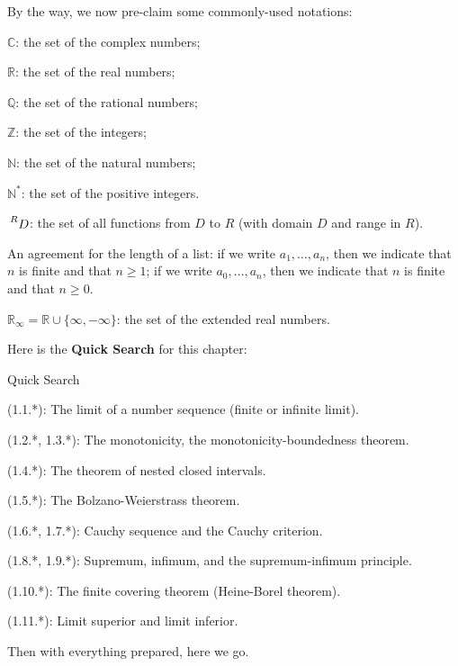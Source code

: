 \documentclass{article}
\begin{document}
By the way, we now pre-claim some commonly-used notations:
\begin{compactenum}
    \item $\mathbb{C}$: the set of the complex numbers;
    \item $\mathbb{R}$: the set of the real numbers;
    \item $\mathbb{Q}$: the set of the rational numbers;
    \item $\mathbb{Z}$: the set of the integers;
    \item $\mathbb{N}$: the set of the natural numbers;
    \item $\mathbb{N^\ast}$: the set of the positive integers.
    \item $\sideset{^R}{}{\mathop{D}}$: the set of all functions from $D$ to $R$ (with domain $D$ and range in $R$).
    \item An agreement for the length of a list: if we write $a_1, \dots, a_n$, then we indicate that $n$ is finite and that $n\geq 1$; if we write $a_0, \dots, a_n$, then we indicate that $n$ is finite and that $n\geq 0$.
    \item $\mathbb{R}_\infty = \mathbb{R}\cup\{\infty, -\infty\}$: the set of the extended real numbers.
\end{compactenum} 

Here is the \textbf{Quick Search} for this chapter:
\begin{Th}{Quick Search}
    \begin{compactdesc}
        \item (1.1.*): The limit of a number sequence (finite or infinite limit).
        \item (1.2.*, 1.3.*): The monotonicity, the monotonicity-boundedness theorem.
        \item (1.4.*): The theorem of nested closed intervals.
        \item (1.5.*): The Bolzano-Weierstrass theorem.
        \item (1.6.*, 1.7.*): Cauchy sequence and the Cauchy criterion.
        \item (1.8.*, 1.9.*): Supremum, infimum, and the supremum-infimum principle.
        \item (1.10.*): The finite covering theorem (Heine-Borel theorem).
        \item (1.11.*): Limit superior and limit inferior.
    \end{compactdesc}
\end{Th}

Then with everything prepared, here we go.
\end{document}
